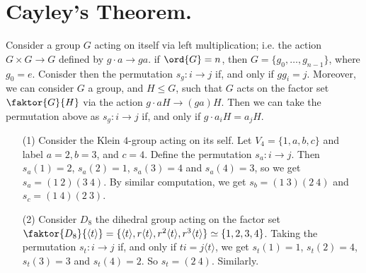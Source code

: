 \section{Cayley's Theorem.}

Consider a group $G$ acting on itself via left multiplication; i.e. the action
$G \times G \xrightarrow{} G$ defined by $g \cdot a \xrightarrow{} ga$. if
$\ord{G}=n$, then $G=\{g_0, \dots, g_{n-1}\}$, where $g_0=e$. Conisder then the
permutation $s_g:i \xrightarrow{} j$ if, and only if $gg_i=j$. Moreover, we can
consider $G$ a group, and  $H \leq G$, such that $G$ acts on the factor set
$\faktor{G}{H}$ via the action $g \cdot aH \xrightarrow{} (ga)H$. Then we can
take the permutation above as $s_g:i \xrightarrow{} j$ if, and only if $g \cdot
a_iH=a_jH$.

\begin{example}\label{}
    \begin{enumerate}
        \item[(1)] Consider the Klein $4$-group acting on its self. Let
            $V_4=\{1, a,b,c\}$ and label $a=2,b=3$, and  $c=4$. Define the
            permutation $s_a:i \xrightarrow{} j$. Then $s_a(1)=2$, $s_a(2)=1$,
            $s_a(3)=4$ and $s_a(4)=3$, so we get $s_a=(1 \ 2)(3 \ 4)$. By
            similar computation, we get $s_b=(1 \ 3)(2 \ 4)$ and $s_c=(1 \ 4)(2
            \ 3)$.

        \item[(2)] Consider $D_8$ the dihedral group acting on the factor set
            $\faktor{D_8}{\langle t \rangle}=\{\langle t \rangle, r \langle t
            \rangle, r^2 \langle t \rangle, r^3 \langle t \rangle\} \simeq
            \{1,2,3,4\}$. Taking the permutation $s_t:i \xrightarrow{} j$ if,
            and only if $ti=j\langle t \rangle$, we get $s_t(1)=1$, $s_t(2)=4$,
            $s_t(3)=3$ and $s_t(4)=2$. So $s_t=(2 \ 4)$. Similarly.
    \end{enumerate}
\end{example}

